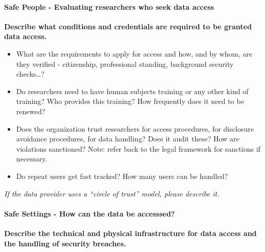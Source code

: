 \documentclass[
]{WileySix}
\providecommand{\tightlist}{%
  \setlength{\itemsep}{0pt}\setlength{\parskip}{0pt}}
\begin{document}
\hypertarget{safe-people---evaluating-researchers-who-seek-data-access}{%
\paragraph{Safe People - Evaluating researchers who seek data access}\label{safe-people---evaluating-researchers-who-seek-data-access}}

\textbf{Describe what conditions and credentials are required to be granted data access.}

\begin{itemize}
\tightlist
\item
  What are the requirements to apply for access and how, and by whom, are they verified - citizenship, professional standing, background security checks\ldots?
\item
  Do researchers need to have human subjects training or any other kind of training? Who provides this training? How frequently does it need to be renewed?
\item
  Does the organization trust researchers for access procedures, for disclosure avoidance procedures, for data handling? Does it audit these? How are violations sanctioned? Note: refer back to the legal framework for sanctions if necessary.
\item
  Do repeat users get fast tracked? How many users can be handled?
\end{itemize}

\emph{If the data provider uses a ``circle of trust'' model, please describe it.}

\hypertarget{safe-settings---how-can-the-data-be-accesssed}{%
\paragraph{Safe Settings - How can the data be accesssed?}\label{safe-settings---how-can-the-data-be-accesssed}}

\textbf{Describe the technical and physical infrastructure for data access and the handling of security breaches.}
\end{document}

